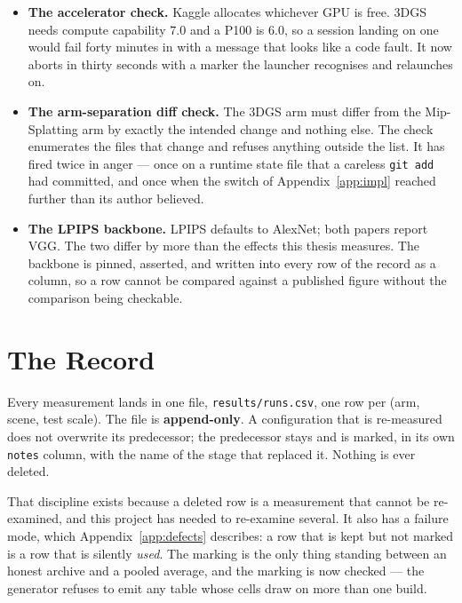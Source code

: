 \begin{itemize}[leftmargin=1.4em,itemsep=3pt]
  \item \textbf{The accelerator check.} Kaggle allocates whichever GPU is free.
        3DGS needs compute capability $7.0$ and a P100 is $6.0$, so a session
        landing on one would fail forty minutes in with a message that looks like
        a code fault. It now aborts in thirty seconds with a marker the launcher
        recognises and relaunches on.
  \item \textbf{The arm-separation diff check.} The 3DGS arm must differ from the
  Mip-Splatting arm by exactly the intended change and nothing else. The check enumerates the files that
        change and refuses anything outside the list. It has fired twice in
        anger --- once on a runtime state file that a careless \texttt{git add}
        had committed, and once when the switch of Appendix~\ref{app:impl}
        reached further than its author believed.
  \item \textbf{The LPIPS backbone.} LPIPS defaults to AlexNet; both papers
        report VGG. The two differ by more than the effects this thesis
        measures. The backbone is pinned, asserted, and written into every row
        of the record as a column, so a row cannot be compared against a
        published figure without the comparison being checkable.
\end{itemize}

\section{The Record}
\label{app:record}

Every measurement lands in one file, \texttt{results/runs.csv}, one row per
(arm, scene, test scale). The file is \textbf{append-only}. A configuration that
is re-measured does not overwrite its predecessor; the predecessor stays and is
marked, in its own \texttt{notes} column, with the name of the stage that
replaced it. Nothing is ever deleted.

That discipline exists because a deleted row is a measurement that cannot be
re-examined, and this project has needed to re-examine several. It also has a
failure mode, which Appendix~\ref{app:defects} describes: a row that is kept but
not marked is a row that is silently \emph{used}. The marking is the only thing
standing between an honest archive and a pooled average, and the marking is now checked --- the generator refuses to emit any table whose
cells draw on more than one build.

